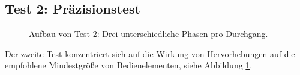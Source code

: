 \documentclass[a4paper,12pt,bibliography=totoc]{scrreprt}%
\begin{document}
\subsection{Test 2: Präzisionstest}
\begin{figure}
\centering
{}
\caption{Aufbau von Test 2: Drei unterschiedliche Phasen pro Durchgang.}
\label{test2phasen}
\end{figure}
Der zweite Test konzentriert sich auf die Wirkung von Hervorhebungen auf die empfohlene Mindestgröße von Bedienelementen, siehe Abbildung \ref{test2phasen}.\\
\end{document}
